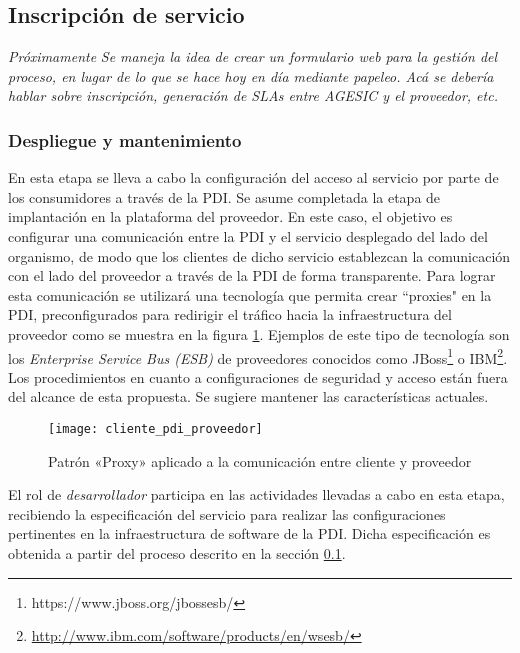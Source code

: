    \subsection{Inscripción de servicio}
      \label{Solucion:Gobernanza:CicloDeVidaAGESIC:Inscripcion}
      \emph{Próximamente}
      \emph{Se maneja la idea de crear un formulario web para la gestión del proceso, en lugar de lo que se hace hoy en día mediante papeleo. Acá se debería hablar sobre inscripción, generación de SLAs entre AGESIC y el proveedor, etc.}

    \subsubsection{Despliegue y mantenimiento}
      \label{Solucion:Gobernanza:CicloDeVidaAGESIC:Despliegue}

      En esta etapa se lleva a cabo la configuración del acceso al servicio por parte de los consumidores a través de la PDI. Se asume completada la etapa de implantación en la plataforma del proveedor. En este caso, el objetivo es configurar una comunicación entre la PDI y el servicio desplegado del lado del organismo, de modo que los clientes de dicho servicio establezcan la comunicación con el lado del proveedor a través de la PDI de forma transparente. Para lograr esta comunicación se utilizará una tecnología que permita crear ``proxies" en la PDI, preconfigurados para redirigir el tráfico hacia la infraestructura del proveedor como se muestra en la figura \ref{imagen:cliente_pdi_proveedor}. Ejemplos de este tipo de tecnología son los \emph{Enterprise Service Bus (ESB)} de proveedores conocidos como JBoss\footnote{https://www.jboss.org/jbossesb/} o IBM\footnote{\url{http://www.ibm.com/software/products/en/wsesb/}}. Los procedimientos en cuanto a configuraciones de seguridad y acceso están fuera del alcance de esta propuesta. Se sugiere mantener las características actuales.

      \begin{figure}[h]
        \centering
        \texttt{[image: cliente\_pdi\_proveedor]}
        \caption{Patrón «Proxy» aplicado a la comunicación entre cliente y proveedor}
        \label{imagen:cliente_pdi_proveedor}
      \end{figure}

      El rol de \emph{desarrollador} participa en las actividades llevadas a cabo en esta etapa, recibiendo la especificación del servicio para realizar las configuraciones pertinentes en la infraestructura de software de la PDI. Dicha especificación es obtenida a partir del proceso descrito en la sección \ref{Solucion:Gobernanza:CicloDeVidaAGESIC:Inscripcion}.

